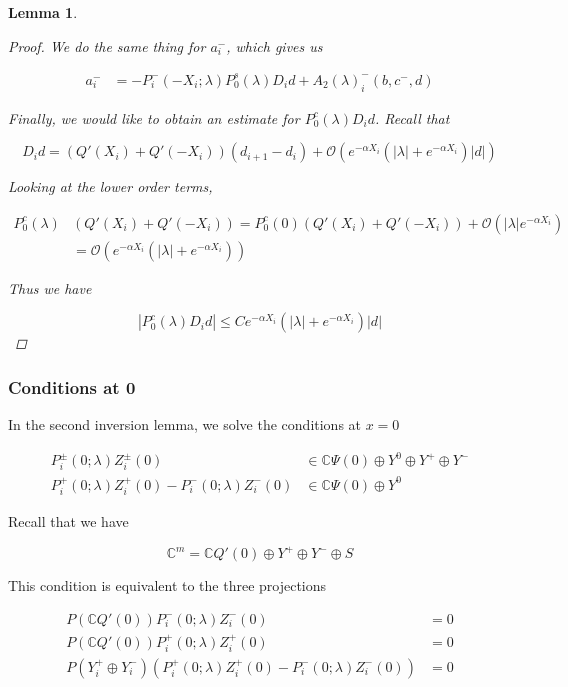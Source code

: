 \documentclass[12pt]{article}
\def\C{{\mathbb C}}
\newtheorem{lemma}{Lemma}
\begin{document}
\begin{lemma}
\begin{proof}
We do the same thing for $a_i^-$, which gives us

\begin{align*}
a_i^- &= -P_i^-(-X_i; \lambda) P_0^s(\lambda) D_i d + A_2(\lambda)_i^-(b, c^-, d)
\end{align*}

Finally, we would like to obtain an estimate for $P_0^c(\lambda) D_i d$. Recall that

\[
D_i d = ( Q'(X_i) + Q'(-X_i))(d_{i+1} - d_i ) + \mathcal{O} \left( e^{-\alpha X_i} \left( |\lambda| +  e^{-\alpha X_i}  \right) |d| \right) 
\]

Looking at the lower order terms,

\begin{align*}
P_0^c(\lambda)&( Q'(X_i) + Q'(-X_i)) 
= P_0^c(0)( Q'(X_i) + Q'(-X_i)) + \mathcal{O}(|\lambda|e^{-\alpha X_i}) \\
&= \mathcal{O}(e^{-\alpha X_i}(|\lambda| + e^{-\alpha X_i}))
\end{align*}

Thus we have

\[
|P_0^c(\lambda) D_i d| \leq C e^{-\alpha X_i}(|\lambda| + e^{-\alpha X_i})|d|
\]

\end{proof}
\end{lemma}

\subsubsection{Conditions at 0}

In the second inversion lemma, we solve the conditions at $x = 0$

\begin{align*}
P_i^\pm(0; \lambda) Z_i^\pm(0) &\in \C \Psi(0) \oplus Y^0 \oplus Y^+ \oplus Y^- \\
P_i^+(0; \lambda) Z_i^+(0) - P_i^-(0; \lambda) Z_i^-(0) &\in \C \Psi(0) \oplus Y^0
\end{align*}

Recall that we have

\[
\C^m = \C Q'(0) \oplus Y^+ \oplus Y^- \oplus S
\]

This condition is equivalent to the three projections

\begin{align*}
P(\C Q'(0) ) P_i^-(0; \lambda) Z_i^-(0) &= 0 \\
P(\C Q'(0) ) P_i^+(0; \lambda) Z_i^+(0) &= 0 \\
P(Y_i^+ \oplus Y_i^-) ( P_i^+(0; \lambda) Z_i^+(0) - P_i^-(0; \lambda) Z_i^-(0) ) &= 0
\end{align*}
\end{document}
